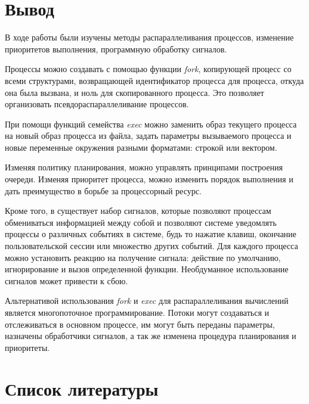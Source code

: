 \documentclass[14pt,a4paper,report]{report}
\begin{document}
\clearpage

\section{Вывод}

В ходе работы были изучены методы распараллеливания процессов, изменение приоритетов выполнения, программную обработку сигналов. 

Процессы можно создавать с помощью функции \emph{fork}, копирующей процесс со всеми структурами, возвращающей идентификатор процесса для процесса, откуда она была вызвана, и ноль для скопированного процесса. Это позволяет организовать псевдораспараллеливание процессов.

При помощи функций семейства \emph{exec} можно заменить образ текущего процесса на новый образ процесса из файла, задать параметры вызываемого процесса и новые переменные окружения разными форматами: строкой или вектором.

Изменяя политику планирования, можно управлять принципами построения очереди. Изменяя приоритет процесса, можно изменить порядок выполнения и дать преимущество в борьбе за процессорный ресурс.

Кроме того, в существует набор сигналов, которые позволяют процессам обмениваться информацией между собой и позволяют системе уведомлять процессы о различных событиях в системе, будь то нажатие клавиш, окончание пользовательской сессии или множество других событий. Для каждого процесса можно установить реакцию на получение сигнала: действие по умолчанию, игнорирование и вызов определенной функции. Необдуманное использование сигналов может привести к сбою.

Альтернативой использования \emph{fork} и \emph{exec} для распараллеливания вычислений является многопоточное программирование. Потоки могут создаваться и отслеживаться в основном процессе, им могут быть переданы параметры, назначены обработчики сигналов, а так же изменена процедура планирования и приоритеты.

\section{Список литературы}
\end{document}
